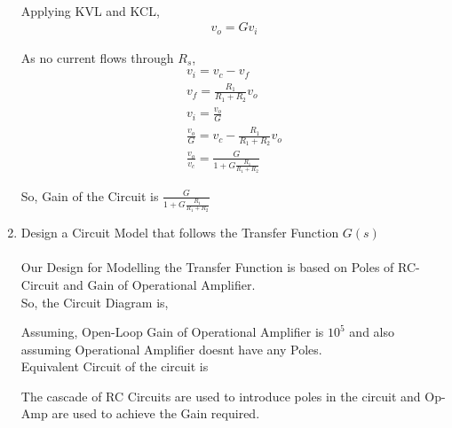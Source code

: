 \begin{enumerate}[label=\thesection.\arabic*.,ref=\thesection.\theenumi]
\solution\\
Applying KVL and KCL,
\begin{align}
v_{o} = Gv_{i}
\end{align}

As no current flows through $R_{s}$,
\begin{align}
v_{i} = v_{c} - v_{f}\\
v_{f} = \frac{R_{1}}{R_{1}+R_{2}}v_{o}\\
v_{i} = \frac{v_{o}}{G}\\
\frac{v_{o}}{G} = v_{c} - \frac{R_{1}}{R_{1}+R_{2}}v_{o}\\
\frac{v_{o}}{v_{c}} = \frac{G}{1+G\frac{R_{1}}{R_{1}+R_{2}}}
\end{align}

So, Gain of the Circuit is $\frac{G}{1+G\frac{R_{1}}{R_{1}+R_{2}}}$
\item Design a Circuit Model that follows the Transfer Function $G(s)$\\
\solution\\
Our Design for Modelling the Transfer Function is based on Poles of RC-Circuit and Gain of Operational Amplifier.\\

So, the Circuit Diagram is,
\begin{figure}[ht!]
	\begin{center}
		\resizebox{\columnwidth/1}{!}{}
	\end{center}
	\caption{}
	\label{fig:ee18btech11014_Open-Loop Circuit}
\end{figure}
 
Assuming, Open-Loop Gain of Operational Amplifier is $10^{5}$ and also assuming Operational Amplifier doesnt have any Poles.\\
Equivalent Circuit of the circuit is
\begin{figure}[ht!]
	\begin{center}
		\resizebox{\columnwidth/1}{!}{}
	\end{center}
	\caption{}
	\label{fig:Equivalent Open-Loop Circuit}
\end{figure}

The cascade of RC Circuits are used to introduce poles in the circuit and Op-Amp are used to achieve the Gain required.\\


\end{enumerate}
